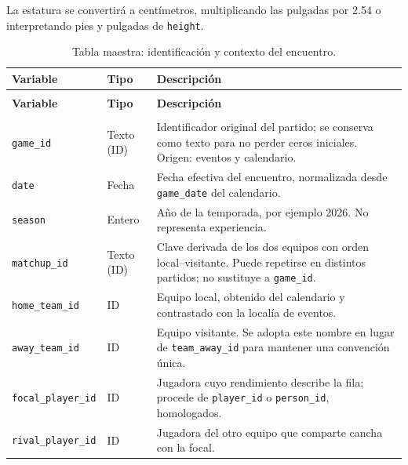 La estatura se convertirá a centímetros, multiplicando las pulgadas por 2.54 o interpretando pies y pulgadas de \texttt{height}. 

\begingroup
\small
{}
\setlength{\tabcolsep}{4pt}
\renewcommand{\arraystretch}{1.15}
\begin{longtable}{@{}>{\raggedright\arraybackslash}p{5.0cm}>{\raggedright\arraybackslash}p{1.9cm}>{\raggedright\arraybackslash}p{7.7cm}@{}}
\caption{Tabla maestra: identificación y contexto del encuentro.}\label{tab:maestra_identificacion}\\
\toprule\textbf{Variable}&\textbf{Tipo}&\textbf{Descripción}\\\midrule\endfirsthead
\multicolumn{3}{l}{\small Continuación de la Tabla~\ref{tab:maestra_identificacion}}\\
\toprule\textbf{Variable}&\textbf{Tipo}&\textbf{Descripción}\\\midrule\endhead
\midrule\multicolumn{3}{r}{\small Continúa en la siguiente página}\\\endfoot
\bottomrule\endlastfoot
\texttt{game\_\allowbreak id} & Texto (ID) & Identificador original del partido; se conserva como texto para no perder ceros iniciales. Origen: eventos y calendario.\\
\texttt{date} & Fecha & Fecha efectiva del encuentro, normalizada desde \texttt{game\_\allowbreak date} del calendario.\\
\texttt{season} & Entero & Año de la temporada, por ejemplo 2026. No representa experiencia.\\
\texttt{matchup\_\allowbreak id} & Texto (ID) & Clave derivada de los dos equipos con orden local--visitante. Puede repetirse en distintos partidos; no sustituye a \texttt{game\_\allowbreak id}.\\
\texttt{home\_\allowbreak team\_\allowbreak id} & ID & Equipo local, obtenido del calendario y contrastado con la localía de eventos.\\
\texttt{away\_\allowbreak team\_\allowbreak id} & ID & Equipo visitante. Se adopta este nombre en lugar de \texttt{team\_\allowbreak away\_\allowbreak id} para mantener una convención única.\\
\texttt{focal\_\allowbreak player\_\allowbreak id} & ID & Jugadora cuyo rendimiento describe la fila; procede de \texttt{player\_\allowbreak id} o \texttt{person\_\allowbreak id}, homologados.\\
\texttt{rival\_\allowbreak player\_\allowbreak id} & ID & Jugadora del otro equipo que comparte cancha con la focal.\\

\end{longtable}
